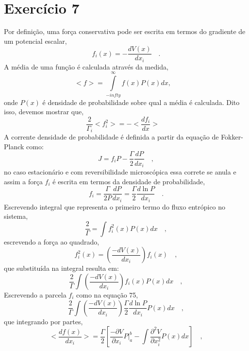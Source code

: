 \documentclass[12pt]{article}
\begin{document}
\section*{Exercício 7}
Por definição, uma força conservativa pode ser escrita em termos do gradiente de um potencial escalar,
\begin{equation}
f_i(x) = -\frac{d V(x)}{dx_i} \quad.
\end{equation}
A média de uma função é calculada através da medida,
\begin{equation}
<f> = \int\limits_{-infty}^{\infty} f(x) P(x) dx, \quad
\end{equation}
onde $P(x)$ é densidade de probabilidade sobre qual a média é calculada. Dito isso, devemos mostrar que,
\begin{equation}
\frac{2}{\Gamma_i}<f_i^2> = -<\frac{df_i}{dx}> \quad
\end{equation}
A corrente densidade de probabilidade é definida a partir da equação de Fokker-Planck como:
\begin{equation}
J = f_iP - \frac{\Gamma}{2}\frac{dP}{dx_i} \quad,
\end{equation}
no caso estacionário e com reversibilidade microscópica essa correte se anula e assim a força $f_i$ é escrita em termos da densidade de probabilidade,
\begin{equation}
f_i = \frac{\Gamma}{2P}\frac{dP}{dx_i} = \frac{\Gamma}{2}\frac{d\ln P}{dx_i}\quad .
\end{equation}
Escrevendo integral que representa o primeiro termo do fluxo entrópico no sistema,
\begin{equation}
\frac{2}{\Gamma} = \int f^2_i(x) P(x) dx \quad,
\end{equation}
escrevendo a força ao quadrado,
\begin{equation}
f^2_i(x) = \left(\frac{-dV(x)}{dx_i}\right)f_i(x) \quad,
\end{equation}
que substituída na integral resulta em:
\begin{equation}
\frac{2}{\Gamma} \int \left(\frac{-dV(x)}{dx_i}\right)f_i(x) P(x) dx \quad ,
\end{equation}
Escrevendo a parcela $f_i$ como na equação 75,
\begin{equation}
\frac{2}{\Gamma} \int \left(\frac{-dV(x)}{dx_i}\right)\frac{\Gamma}{2}\frac{d\ln P}{dx_i} P(x) dx \quad ,
\end{equation}
que integrando por partes,
\begin{equation}
<\frac{df(x)}{dx_i}> = \frac{\Gamma}{2}\left[ \frac{-\partial V}{\partial x_i} P\Big\rvert_a^b - \int \frac{\partial^2 V}{\partial x_i^2}P(x) dx  \right] \quad ,
\end{equation}
\end{document}
